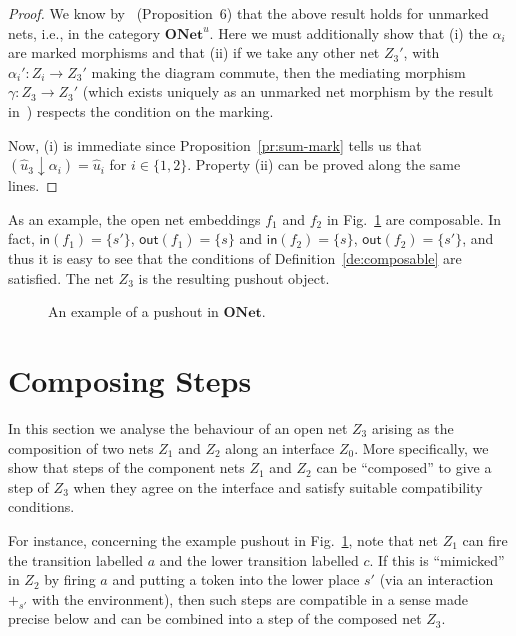 \documentclass{LMCS}
\newcommand{\inp}[1]{\ensuremath{\mathsf{in}({#1})}}
\newcommand{\out}[1]{\ensuremath{\mathsf{out}({#1})}}
\newcommand{\init}[1]{\hat{#1}}
\newcommand{\res}[2]{\ensuremath{({#1}\!\downarrow\!{#2})}}
\newcommand{\onet}{\ensuremath{\mathbf{ONet}}}
\newcommand{\uonet}{\ensuremath{\mathbf{ONet}^u}}
\begin{document}
\begin{proof}
  We know by~\cite{BCEH:CSOP} (Proposition~6) that the above result
  holds for unmarked nets, i.e., in the category $\uonet$.
Here we must additionally show that (i) the $\alpha_i$ are
  marked morphisms and that (ii) if we take any other net $Z_3'$, with
  $\alpha_i' : Z_i \to Z_3'$ making the diagram commute, then the
  mediating morphism $\gamma : Z_3 \to Z_3'$ (which exists uniquely as
  an unmarked net morphism by the result in~\cite{BCEH:CSOP}) respects the
  condition on the marking.
  
  Now, (i) is immediate since Proposition~\ref{pr:sum-mark} tells us that
  $\res{\init{u}_3}{\alpha_i} = \init{u}_i$ for $i \in \{1,2\}$.
Property (ii) can be proved along the same lines.
\end{proof}


As an example, the open net embeddings $f_1$ and $f_2$ in
Fig.~\ref{fi:pushout} are composable. In fact, $\inp{f_1} = \{ s'\}$,
$\out{f_1} = \{ s \}$ and $\inp{f_2} = \{ s \}$, $\out{f_2}= \{ s'
\}$, and thus it is easy to see that the conditions of
Definition~\ref{de:composable} are satisfied. The net $Z_3$ is the
resulting pushout object.

\begin{figure}[t]
  \begin{center}
  \end{center}

  \caption{An example of a pushout in $\onet$.}
  \label{fi:pushout}
\end{figure}


\section{Composing Steps}



In this section we analyse the behaviour of an open net $Z_3$ arising
as the composition of two nets $Z_1$ and $Z_2$ along an interface
$Z_0$.  More specifically,
we show that steps of the component
nets $Z_1$ and $Z_2$ can be ``composed'' to give a step of $Z_3$ when
they agree on the interface and satisfy suitable compatibility
conditions.

For instance, concerning the example pushout in Fig.~\ref{fi:pushout},
note that net $Z_1$ can fire the transition labelled $a$ and the lower
transition labelled $c$. If this is ``mimicked'' in $Z_2$ by firing
$a$ and putting a token into the lower place $s'$ (via an interaction
$+_{s'}$ with the environment), then such steps are compatible in a
sense made precise below and can be combined into a step of the
composed net $Z_3$.
\end{document}
